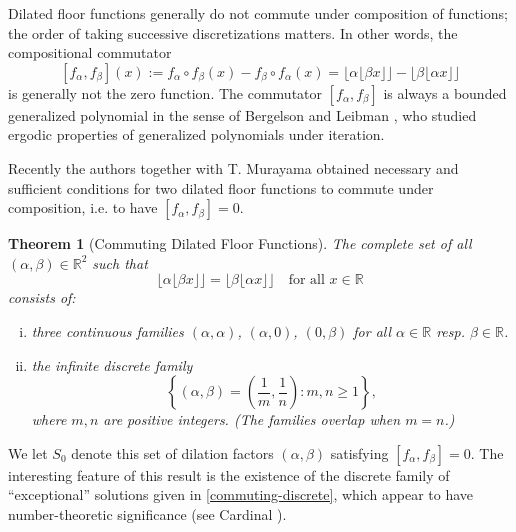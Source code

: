 \documentclass[11pt, letterpaper, reqno]{amsart}
\newtheorem{thm}{Theorem}[section]
\theoremstyle{definition}
\numberwithin{equation}{section}
\newcommand{\RR}{\ensuremath{\mathbb{R}}}
\newcommand{\floor}[1]{\lfloor{#1}\rfloor}
\begin{document}
Dilated floor functions generally  do not  commute under composition of functions; 
the order of taking   successive discretizations matters. 
In other words, the compositional commutator 
$$
 [ f_{\alpha}, f_{\beta}](x) := f_{\alpha}\circ f_{\beta} (x) - f_{\beta}\circ f_{\alpha}(x) 
 = \floor{\alpha \floor{\beta x}} -  \floor{\beta \floor{\alpha  x}}
$$ 
is generally not the zero function.
The commutator $[f_{\alpha}, f_{\beta}]$
is always a bounded generalized polynomial in the sense of Bergelson and Leibman \cite{BerL07}, 
who studied ergodic properties of generalized polynomials under iteration.

Recently the   authors  together  with T. Murayama \cite{LMR16}   
obtained  necessary and sufficient conditions 
for two dilated floor  functions to commute 
under composition, i.e. to have
 $[f_{\alpha}, f_{\beta}] =0$. 

\setcounter{thm}{-1}
\begin{thm}[Commuting Dilated Floor Functions]
\label{thm:commuting}
 The complete set of all $(\alpha, \beta) \in \RR^2$ such that
  \[
    \lfloor \alpha \lfloor \beta x\rfloor \rfloor = \lfloor \beta \lfloor \alpha x\rfloor \rfloor \quad \text{for all }x\in\RR
  \]
  consists of:
  \begin{enumerate}[(i)]
    \item
      three continuous families $(\alpha, \alpha)$, $(\alpha, 0)$, $(0, \beta)$ for
      all $\alpha \in \RR$ resp. $\beta \in \RR$.
    
    \item
    \label{commuting-discrete}
      the infinite discrete family 
      \[
        \left\{ (\alpha, \beta) = \left(\frac{1}{m}, \frac{1}{n}\right) : m, n
        \ge 1 \right\},
      \]
      where $m,n$ are positive integers. (The families overlap when $m=n$.)
  \end{enumerate}
\end{thm}
\noindent We let $S_0$ denote this set of dilation factors $(\alpha,\beta)$ satisfying $[f_\alpha,f_\beta]=0$.
The  interesting feature of this result is the existence of the  
discrete family  of ``exceptional'' solutions given in \eqref{commuting-discrete},
which appear to have number-theoretic significance
(see Cardinal \cite[Lemma 6]{Car10}).
\end{document}
